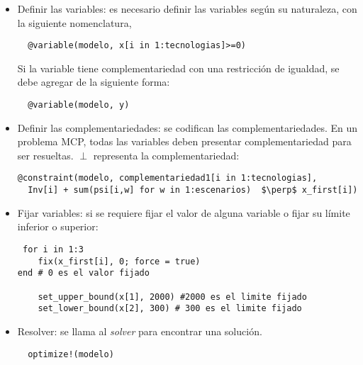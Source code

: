 \begin{itemize}
   \item Definir las variables: es necesario definir las variables según su naturaleza, con la siguiente nomenclatura,
   
   \begin{footnotesize}
   \begin{lstlisting}
  @variable(modelo, x[i in 1:tecnologias]>=0)
   \end{lstlisting}
   \end{footnotesize}
   Si la variable tiene complementariedad con una restricción de igualdad, se debe agregar de la siguiente forma:
   \begin{footnotesize}
   \begin{lstlisting}
  @variable(modelo, y)
   \end{lstlisting}
   \end{footnotesize}
   
  
  \item Definir las complementariedades: se codifican las complementariedades. En un problema MCP, todas las variables deben presentar complementariedad para ser resueltas. $\perp$ representa la complementariedad:
  
  \begin{footnotesize}
  \begin{lstlisting}[mathescape=true]
  @constraint(modelo, complementariedad1[i in 1:tecnologias],  
  Inv[i] + sum(psi[i,w] for w in 1:escenarios)  $\perp$ x_first[i])
  \end{lstlisting}
  \end{footnotesize}
  
  \item Fijar variables: si se requiere fijar el valor de alguna variable o fijar su límite inferior o superior:
  
  \begin{footnotesize}
  \begin{lstlisting}
 for i in 1:3
    fix(x_first[i], 0; force = true) 
end # 0 es el valor fijado
    
    set_upper_bound(x[1], 2000) #2000 es el limite fijado
    set_lower_bound(x[2], 300) # 300 es el limite fijado
  \end{lstlisting}
  \end{footnotesize}
  
  
  \item  Resolver: se llama al \textit{solver} para encontrar una solución.
  
  \begin{footnotesize}
   \begin{lstlisting}
  optimize!(modelo)
  \end{lstlisting}
  \end{footnotesize}
 
\end{itemize}

